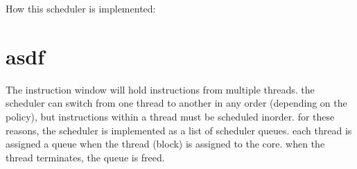 How this scheduler is implemented: \par
 \hypertarget{page1_asdf}{}\section{asdf}\label{page1_asdf}
The instruction window will hold instructions from multiple threads. the scheduler can switch from one thread to another in any order (depending on the policy), but instructions within a thread must be scheduled inorder. for these reasons, the scheduler is implemented as a list of scheduler queues. each thread is assigned a queue when the thread (block) is assigned to the core. when the thread terminates, the queue is freed. 